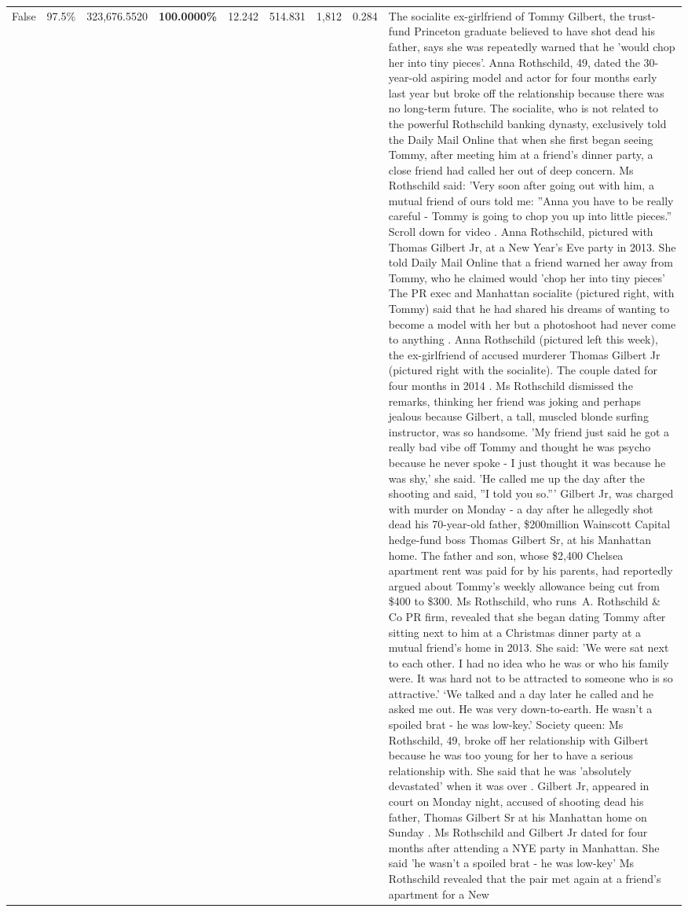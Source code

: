 \begin{table}[H]
\begin{tabular}{lllrlllll}
False & 97.5\% & 323,676.5520 & \bfseries \color{red} 100.0000\% & 12.242 & 514.831 & 1,812 & 0.284 & The socialite ex-girlfriend of Tommy Gilbert, the trust-fund Princeton graduate believed to have shot dead his father, says she was repeatedly warned that he 'would chop her into tiny pieces'. Anna Rothschild, 49, dated the 30-year-old aspiring model and actor for four months early last year but broke off the relationship because there was no long-term future. The socialite, who is not related to the powerful Rothschild banking dynasty, exclusively told the Daily Mail Online that when she first began seeing Tommy, after meeting him at a friend's dinner party, a close friend had called her out of deep concern. Ms Rothschild said: 'Very soon after going out with him, a mutual friend of ours told me: ''Anna you have to be really careful - Tommy is going to chop you up into little pieces.'' Scroll down for video . Anna Rothschild, pictured with Thomas Gilbert Jr, at a New Year's Eve party in 2013. She told Daily Mail Online that a friend warned her away from Tommy, who he claimed would 'chop her into tiny pieces' The PR exec and Manhattan socialite (pictured right, with Tommy) said that he had shared his dreams of wanting to become a model with her but a photoshoot had never come to anything . Anna Rothschild (pictured left this week), the ex-girlfriend of accused murderer Thomas Gilbert Jr (pictured right with the socialite). The couple dated for four months in 2014 . Ms Rothschild dismissed the remarks, thinking her friend was joking and perhaps jealous because Gilbert, a tall, muscled blonde surfing instructor, was so handsome. 'My friend just said he got a really bad vibe off Tommy and thought he was psycho because he never spoke - I just thought it was because he was shy,' she said. 'He called me up the day after the shooting and said, ''I told you so.''' Gilbert Jr, was charged with murder on Monday - a day after he allegedly shot dead his 70-year-old father, \$200million Wainscott Capital hedge-fund boss Thomas Gilbert Sr, at his Manhattan home. The father and son, whose \$2,400 Chelsea apartment rent was paid for by his parents, had reportedly argued about Tommy's weekly allowance being cut from \$400 to \$300. Ms Rothschild, who runs A. Rothschild \& Co PR firm, revealed that she began dating Tommy after sitting next to him at a Christmas dinner party at a mutual friend's home in 2013. She said: 'We were sat next to each other. I had no idea who he was or who his family were. It was hard not to be attracted to someone who is so attractive.' ‘We talked and a day later he called and he asked me out. He was very down-to-earth. He wasn’t a spoiled brat - he was low-key.’ Society queen: Ms Rothschild, 49, broke off her relationship with Gilbert because he was too young for her to have a serious relationship with. She said that he was 'absolutely devastated' when it was over . Gilbert Jr, appeared in court on Monday night, accused of shooting dead his father, Thomas Gilbert Sr at his Manhattan home on Sunday . Ms Rothschild and Gilbert Jr dated for four months after attending a NYE party in Manhattan. She said 'he wasn't a spoiled brat - he was low-key' Ms Rothschild revealed that the pair met again at a friend’s apartment for a New 
\end{tabular}
\end{table}
